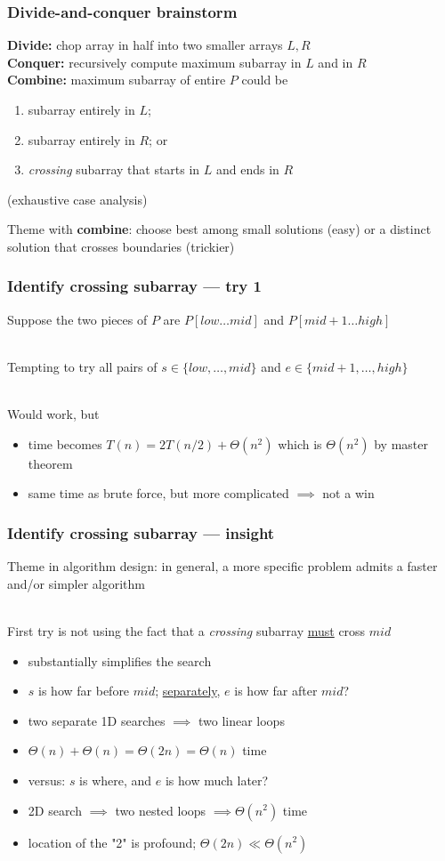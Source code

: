 \documentclass{beamer}
\newcommand{\stanza}{ \\~\ }
\begin{document}
\begin{frame} \frametitle{Divide-and-conquer brainstorm}
\textbf{Divide:} chop array in half into two smaller arrays $L, R$\\
\textbf{Conquer:} recursively compute maximum subarray in $L$ and in $R$ \\
\textbf{Combine:} maximum subarray of entire $P$ could be
\begin{enumerate}
  \item subarray entirely in $L$;
  \item subarray entirely in $R$; or
  \item \emph{crossing} subarray that starts in $L$ and ends in $R$
\end{enumerate}
(exhaustive case analysis)

Theme with \textbf{combine}: choose best among small solutions (easy) or
a distinct solution that crosses boundaries (trickier)
\end{frame}

\begin{frame} \frametitle{Identify crossing subarray --- try 1}
Suppose the two pieces of $P$ are $P[low \ldots mid]$ and
  $P[mid+1 \ldots high]$ \stanza

Tempting to try all pairs of $s \in \{low, \ldots, mid \}$ and
$e \in \{mid+1, \ldots, high\}$ \stanza

Would work, but
\begin{itemize}
  \item time becomes $T(n) = 2 T(n/2) + \Theta(n^2)$ which is $\Theta(n^2)$
    by master theorem
  \item same time as brute force, but more complicated $\implies$ not a win
\end{itemize}
\end{frame}

\begin{frame} \frametitle{Identify crossing subarray --- insight}
Theme in algorithm design: in general, a more specific problem admits a
  faster and/or simpler algorithm \stanza

First try is not using the fact that a \emph{crossing} subarray
\underline{must} cross $mid$
\begin{itemize}
  \item substantially simplifies the search
  \item $s$ is how far before $mid$; \underline{separately}, $e$ is how far after $mid$?
  \item two separate 1D searches $\implies$ two linear loops
  \item $\Theta(n)+\Theta(n) = \Theta(2n) = \Theta(n)$ time
  \item versus: $s$ is where, and $e$ is how much later?
  \item 2D search $\implies$ two nested loops $\implies \Theta(n^2)$ time
  \item location of the "2" is profound; $\Theta(2n) \ll \Theta(n^2)$
\end{itemize}
\end{frame}
\end{document}
